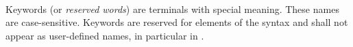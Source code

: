 
\begin{grammar}
\oneof \\
\terminal{\_}
\end{grammar}

\specsubitem
Keywords (or \textit{reserved words}) are terminals with special meaning. These
names are case-sensitive. Keywords are reserved for elements of the syntax
and shall not appear as user-defined names, in particular in
.
